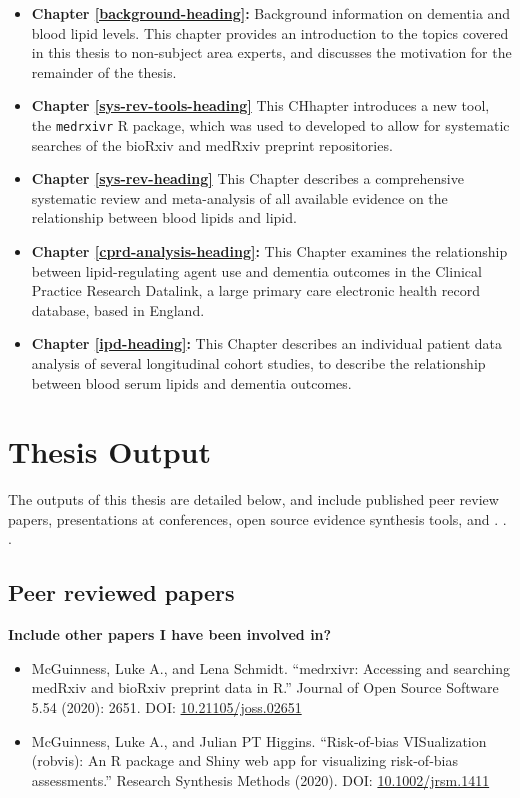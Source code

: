 \documentclass[a4paper, twoside]{templates/ociamthesis}
\providecommand{\tightlist}{%
  \setlength{\itemsep}{0pt}\setlength{\parskip}{0pt}}
\begin{document}
\begin{itemize}
\tightlist
\item
  \textbf{Chapter \ref{background-heading}:} Background information on dementia and blood lipid levels. This chapter provides an introduction to the topics covered in this thesis to non-subject area experts, and discusses the motivation for the remainder of the thesis.
\item
  \textbf{Chapter \ref{sys-rev-tools-heading}} This CHhapter introduces a new tool, the \texttt{medrxivr} R package, which was used to developed to allow for systematic searches of the bioRxiv and medRxiv preprint repositories.
\item
  \textbf{Chapter \ref{sys-rev-heading}} This Chapter describes a comprehensive systematic review and meta-analysis of all available evidence on the relationship between blood lipids and lipid.
\item
  \textbf{Chapter \ref{cprd-analysis-heading}:} This Chapter examines the relationship between lipid-regulating agent use and dementia outcomes in the Clinical Practice Research Datalink, a large primary care electronic health record database, based in England.
\item
  \textbf{Chapter \ref{ipd-heading}:} This Chapter describes an individual patient data analysis of several longitudinal cohort studies, to describe the relationship between blood serum lipids and dementia outcomes.
\end{itemize}

\hypertarget{thesis-output}{%
\section{Thesis Output}\label{thesis-output}}

The outputs of this thesis are detailed below, and include published peer review papers, presentations at conferences, open source evidence synthesis tools, and . . .

\hypertarget{peer-reviewed-papers}{%
\subsection{Peer reviewed papers}\label{peer-reviewed-papers}}

\textbf{Include other papers I have been involved in?}

\begin{itemize}
\item
  McGuinness, Luke A., and Lena Schmidt. ``medrxivr: Accessing and searching medRxiv and bioRxiv preprint data in R.'' Journal of Open Source Software 5.54 (2020): 2651. DOI: \href{https://doi.org/10.21105/joss.02651}{10.21105/joss.02651}
\item
  McGuinness, Luke A., and Julian PT Higgins. ``Risk‐of‐bias VISualization (robvis): An R package and Shiny web app for visualizing risk‐of‐bias assessments.'' Research Synthesis Methods (2020). DOI: \href{https://doi.org/10.1002/jrsm.1411}{10.1002/jrsm.1411}
\end{itemize}
\end{document}
